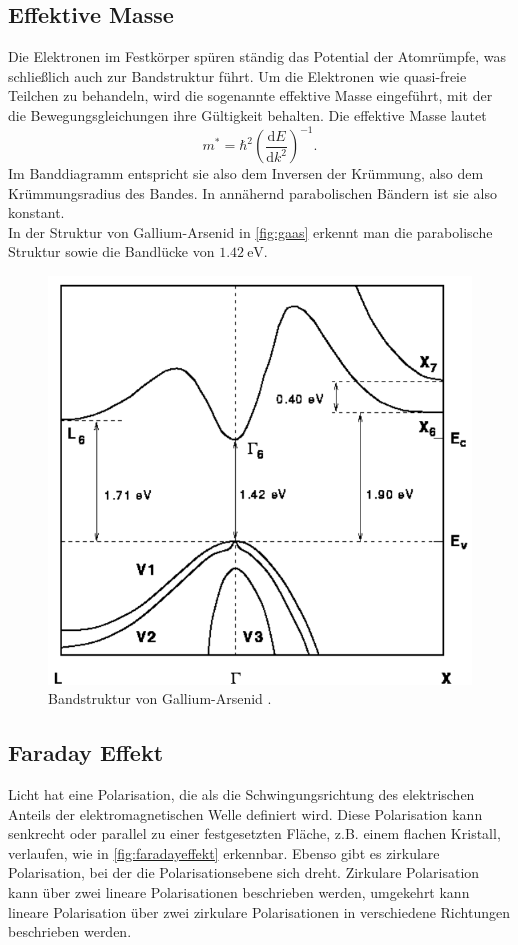 \subsection{Effektive Masse}
Die Elektronen im Festkörper spüren ständig das Potential der Atomrümpfe, was schließlich auch zur Bandstruktur führt. Um die Elektronen wie quasi-freie Teilchen zu behandeln, wird die sogenannte effektive Masse eingeführt,
mit der die Bewegungsgleichungen ihre Gültigkeit behalten. Die effektive Masse lautet
\begin{equation}
    m^{*} = \hbar^2 \left( \frac{\text{d}E}{\text{d}k^2} \right) ^{-1}.
    \label{eq:effektive_masse}
\end{equation}
Im Banddiagramm entspricht sie also dem Inversen der Krümmung, also dem Krümmungsradius des Bandes. In annähernd parabolischen Bändern ist sie also konstant.\\
In der Struktur von Gallium-Arsenid in \autoref{fig:gaas} erkennt man die parabolische Struktur sowie die Bandlücke von $\qty{1.42}{\electronvolt}$.
\begin{figure}[H]
    \centering
    \includegraphics[width=\textwidth]{Bilder/gaas.png}
    \caption{Bandstruktur von Gallium-Arsenid \cite{gaas}.}
    \label{fig:gaas}
\end{figure}


\subsection{Faraday Effekt}
Licht hat eine Polarisation, die als die Schwingungsrichtung des elektrischen Anteils der elektromagnetischen Welle definiert wird. Diese Polarisation kann senkrecht oder parallel zu einer festgesetzten Fläche,
z.B. einem flachen Kristall, verlaufen, wie in \autoref{fig:faradayeffekt}
erkennbar. Ebenso gibt es zirkulare Polarisation, bei der die Polarisationsebene sich dreht. Zirkulare Polarisation kann über zwei lineare Polarisationen beschrieben werden, umgekehrt kann lineare Polarisation über zwei zirkulare
Polarisationen in verschiedene Richtungen beschrieben werden. \\

